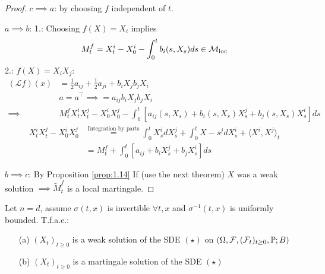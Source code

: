 \begin{proof}
    \underline{$c\implies a$}: by choosing $f$ independent of $t$.

    \underline{$ a \implies b$}: 1.: Choosing $f(X)=X_i$ implies 
    \begin{align*}
        M_t^f=X_t^i-X_0^i-\int_0^t b_i(s,X_s)ds\in\mathcal{M}_{\text{loc}}
    \end{align*}
    2.: $f(X)=X_iX_j$: 
    \begin{align*}
        (\mathcal{L}f)(x)&=\frac{1}{2}a_{ij}+\frac{1}{2}a_{ji}+b_iX_j b_jX_i\\
        &a=a^\intercal\implies =a_{ij} b_iX_j b_j X_i\\
        \implies& M_t^f X_t^i X_t^j-X_0^iX_0^j-\int_0^t\left[a_{ij}(s,X_s)+b_i(s,X_s)X_s^j+b_j(s,X_s)X_s^i\right]ds
    \end{align*}
    \begin{align*}
        X_t^iX_t^j-X_0^iX_0^j&\stackrel{\text{Integration by parts}}{=}\int_0^t X_s^i dX_s^j+\int_0^t X-s^j dX_s^i + \langle X^i,X^j\rangle_t\\
        &= M_t^f+\int_0^t [a_{ij}+b_iX_s^j+b_jX_s^i] ds
    \end{align*}


    \underline{$b\implies c$}: By Proposition \ref{prop:1.14} If (use the next theorem) $X$ was a weak solution $\implies \tilde{M}_t^f$ is a local martingale. 
\end{proof}


\begin{theorem}\label{thm:1.20}
    Let $n=d$, %
    assume $\sigma(t,x)$ is invertible
    $\forall t,x$ and $\sigma^{-1}(t,x)$ is uniformly bounded. T.f.a.e.:
    \begin{enumerate}
        \item[(a)] $(X_t)_{t\geq 0}$ is a weak solution of the SDE $(\star)$ on $(\Omega,\mathcal{F},(\mathcal{F}_t)_{t\geq 0},\mathbb{P};B)$
        \item[(b)] $(X_t)_{t\geq 0}$ is a martingale solution of the SDE $(\star)$ 
    \end{enumerate}
\end{theorem}

